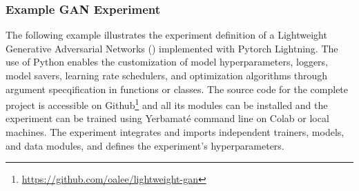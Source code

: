 \subsubsection{Example GAN Experiment}

The following example illustrates the experiment definition of a Lightweight Generative Adversarial Networks (\cite{lgan,goodfellow2020generative}) implemented with Pytorch Lightning. The use of Python enables the customization of model hyperparameters, loggers, model savers, learning rate schedulers, and optimization algorithms through argument specqification in functions or classes. The source code for the complete project is accessible on Github\footnote{\url{https://github.com/oalee/lightweight-gan}} and all its modules can be installed and the experiment can be trained using Yerbamaté command line on Colab or local machines. The experiment integrates and imports independent trainers, models, and data modules, and defines the experiment's hyperparameters.



